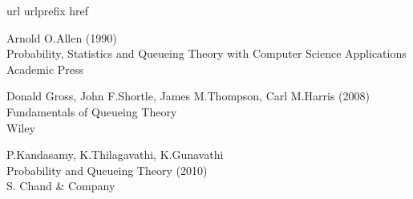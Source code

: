 \documentclass[a4paper,10pt]{scrartcl}
\theoremstyle{definition}
\numberwithin{equation}{section}
\begin{document}

\newpage
\begin{thebibliography}{10}
  \expandafter\ifx\csname url\endcsname\relax
  \def\url#1{\texttt{#1}}\fi
  \expandafter\ifx\csname urlprefix\endcsname\relax\def\urlprefix{URL }\fi
  \expandafter\ifx\csname href\endcsname\relax
  \def\href#1#2{#2} \def\path#1{#1}\fi

  Arnold O.Allen (1990)\\
  Probability, Statistics and Queueing Theory with Computer Science Applications\\
  Academic Press

  Donald Gross, John F.Shortle, James M.Thompson, Carl M.Harris (2008)\\
  Fundamentals of Queueing Theory\\
  Wiley
  
  P.Kandasamy, K.Thilagavathi, K.Gunavathi\\
  Probability and Queueing Theory (2010)\\
  S. Chand \& Company
\end{thebibliography}
\end{document}
